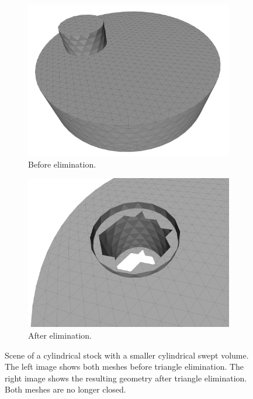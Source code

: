 \begin{figure}[!h]
	\centering
	\begin{subfigure}[b]{0.4\textwidth}
		\centering
		\includegraphics[width=\textwidth]{images/cylinders_classification_before}
		\caption{Before elimination.}
		\label{fig:cylinders_classification_before}
	\end{subfigure}
	\begin{subfigure}[b]{0.4\textwidth}
		\centering
		\includegraphics[width=\textwidth]{images/cylinders_classification_after}
		\caption{After elimination.}
		\label{fig:cylinders_classification_after}
	\end{subfigure}
	\caption{
		Scene of a cylindrical stock with a smaller cylindrical swept volume.
		The left image shows both meshes before triangle elimination.
		The right image shows the resulting geometry after triangle elimination.
		Both meshes are no longer closed.
	}
	\label{fig:cylinders_classification}
\end{figure}


